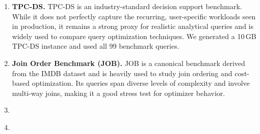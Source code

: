 \begin{enumerate}[leftmargin=0.5cm]


\item \textbf{TPC-DS.}
TPC-DS is an industry-standard decision support benchmark. While it does not perfectly capture the recurring, user-specific workloads seen in production, it remains a strong proxy for realistic analytical queries and is widely used to compare query optimization techniques. We generated a 10\,GB TPC-DS instance and used all 99 benchmark queries.

\item \textbf{Join Order Benchmark (JOB).}
JOB is a canonical benchmark derived from the IMDB dataset and is heavily used to study join ordering and cost-based optimization. Its queries span diverse levels of complexity and involve multi-way joins, making it a good stress test for optimizer behavior.

\item \textbf{}

\item \textbf{}


\end{enumerate}

